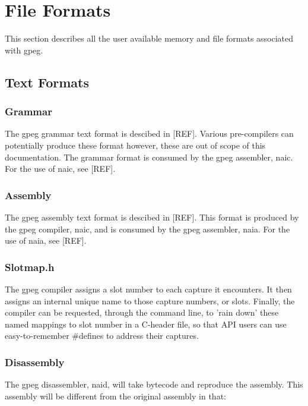 \section{File Formats}

This section describes all the user available memory and file formats
associated with gpeg.

\subsection{Text Formats}

\subsubsection{Grammar}

The gpeg grammar text format is descibed in [REF].
Various pre-compilers can potentially produce these format however,
these are out of scope of this documentation. The grammar format is
consumed by the gpeg assembler, naic. For the use of naic, see [REF].

\subsubsection{Assembly}

The gpeg assembly text format is descibed in [REF].
This format is produced by the gpeg compiler, naic,
and is consumed by the gpeg assembler, naia.
For the use of naia, see [REF].

\subsubsection{Slotmap.h}

The gpeg compiler assigns a slot number to each capture it encounters.
It then assigns an internal unique name to those capture numbers, or slots.
Finally, the compiler can be requested, through the command line, to
'rain down' these named mappings to slot number in a C-header file, so that
API users can use easy-to-remember \#defines to address their captures.

\subsubsection{Disassembly}

The gpeg disassembler, naid, will take bytecode and reproduce the
assembly. This assembly will be different from the original assembly
in that:

